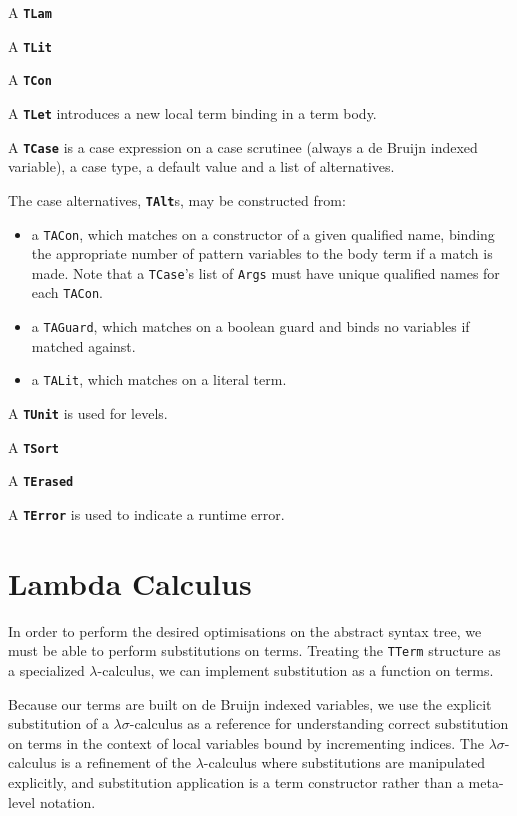 A \textbf{\lstinline{TLam}} %

A \textbf{\lstinline{TLit}} %

A \textbf{\lstinline{TCon}} %

A \textbf{\lstinline{TLet}} introduces a new local term binding in a term body.

A \textbf{\lstinline{TCase}} is a case expression on a case scrutinee (always a de Bruijn indexed variable), a case type, a default value and a list of alternatives.

The case alternatives, \textbf{\lstinline{TAlt}}s, may be constructed from:
\begin{itemize}
\item a \lstinline{TACon}, which matches on a constructor of a given qualified name, binding the appropriate number of pattern variables to the body term if a match is made. Note that a \lstinline{TCase}'s list of \lstinline{Args} must have unique qualified names for each \lstinline{TACon}.
\item a \lstinline{TAGuard}, which matches on a boolean guard and binds no variables if matched against.
\item a \lstinline{TALit}, which matches on a literal term.
\end{itemize}

A \textbf{\lstinline{TUnit}} is used for levels. %

A \textbf{\lstinline{TSort}}

A \textbf{\lstinline{TErased}}

A \textbf{\lstinline{TError}} is used to indicate a runtime error.

\section{Lambda Calculus}
\label{sec:lambda_calc}


In order to perform the desired optimisations on the abstract syntax tree, we must be able to perform substitutions on terms. Treating the \lstinline{TTerm} structure as a specialized $\lambda$-calculus, we can implement substitution as a function on terms.

Because our terms are built on de Bruijn indexed variables, we use the explicit substitution of a $\lambda\sigma$-calculus as a reference for understanding correct substitution on terms in the context of local variables bound by incrementing indices. The $\lambda\sigma$-calculus is a refinement of the $\lambda$-calculus where substitutions are manipulated explicitly, and substitution application is a term constructor rather than a meta-level notation.\cite{abadi1991}

